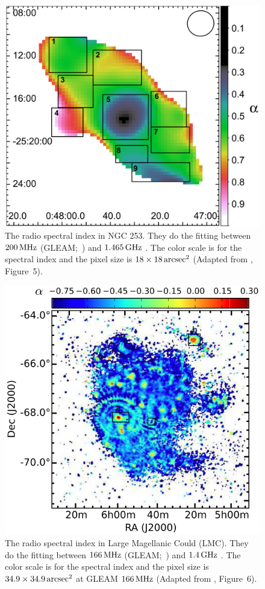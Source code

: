 \begin{figure}[htbp]
	\centering
	\includegraphics[width=.6\linewidth]{Chapter_1/Figures/Kapinska2017_Figure5.png}
    \caption[The spectral index map in NGC 253]{\label{fig:Kapinska2017_Figure5}
        The radio spectral index in NGC 253.
        They do the fitting between $200\,\mathrm{MHz}$ (GLEAM;~\citealt{Hurley-Walker2017a}) and $1.465\,\mathrm{GHz}$ \citep{Carilli1992}.
        The color scale is for the spectral index and the pixel size is $18 \times 18 \,\mathrm{arcsec}^2$
        (Adapted from \citealt{Kapinska2017a}, Figure~5).
    }
\end{figure}

\begin{figure}[htbp]
	\centering
	\includegraphics[width=.6\linewidth]{Chapter_1/Figures/For2018_Figure6.png}
    \caption[The spectral index map in Large Magellanic Cloud]{\label{fig:For2018_Figure6}
        The radio spectral index in Large Magellanic Could (LMC).
        They do the fitting between $166\,\mathrm{MHz}$ (GLEAM;~\citealt{Hurley-Walker2017a}) and $1.4\,\mathrm{GHz}$ \citep{Hughes2007}.
        The color scale is for the spectral index and the pixel size is $34.9 \times 34.9 \,\mathrm{arcsec}^2$ at GLEAM $166\,\mathrm{MHz}$
        (Adapted from \citealt{For2018a}, Figure~6).
    }
\end{figure}

